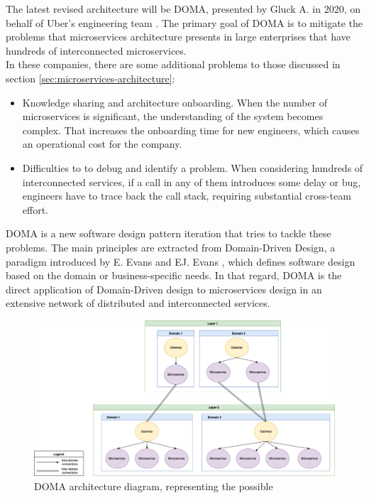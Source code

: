 \documentclass[english, 12pt, a4paper, sci, utf8, a-1b, online]{aaltothesis}
\begin{document}

The latest revised architecture will be DOMA, presented by Gluck A. in 2020, on behalf of Uber's engineering team \cite{DOMAUber}. The primary goal of DOMA is to mitigate the problems that microservices architecture presents in large enterprises that have hundreds of interconnected microservices.\\

In these companies, there are some additional problems to those discussed in section \ref{sec:microservices-architecture}:

\begin{itemize}
    \item Knowledge sharing and architecture onboarding. When the number of microservices is significant, the understanding of the system becomes complex. That increases the onboarding time for new engineers, which causes an operational cost for the company.
    \item Difficulties to to debug and identify a problem. When considering hundreds of interconnected services, if a call in any of them introduces some delay or bug, engineers have to trace back the call stack, requiring substantial cross-team effort.
\end{itemize}

DOMA is a new software design pattern iteration that tries to tackle these problems. The main principles are extracted from Domain-Driven Design, a paradigm introduced by E. Evans and EJ. Evans \cite{evans2004domain}, which defines software design based on the domain or business-specific needs. In that regard, DOMA is the direct application of Domain-Driven design to microservices design in an extensive network of distributed and interconnected services.\\

\begin{figure}[h!]
    \centering
    \includegraphics[scale=0.3]{src/thesis/img/literature-review/doma.png}
    \caption{DOMA architecture diagram, representing the possible }
    \label{fig:my_label}
\end{figure}
\end{document}
